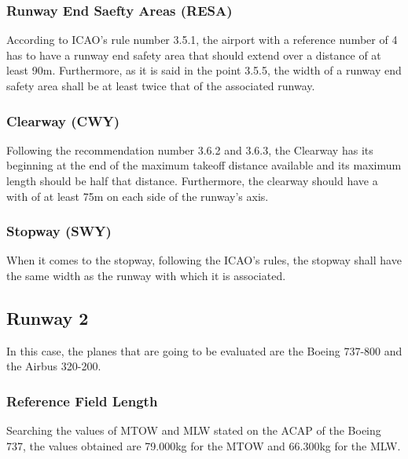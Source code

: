 			\subsubsection{Runway End Saefty Areas (RESA)}
			According to ICAO's rule number 3.5.1, the airport with a reference number of 4 has to have a runway end safety area that should extend over a distance of at least 90m. Furthermore, as it is said in the point 3.5.5, the width of a runway end safety area shall be at least twice that of the associated runway. 
			
			\subsubsection{Clearway (CWY)}
			Following the recommendation number 3.6.2 and 3.6.3, the Clearway has its beginning at the end of the maximum takeoff distance available and its maximum length should be half that distance. Furthermore, the clearway should have a with of at least 75m on each side of the runway's axis. 
			
			
			\subsubsection{Stopway (SWY)}
			When it comes to the stopway, following the ICAO's rules, the stopway shall have the same width as the runway with which it is associated.

			
		\subsection{Runway 2}
		In this case, the planes that are going to be evaluated are the Boeing 737-800 and the Airbus 320-200.
		\subsubsection{Reference Field Length}
		Searching the values of MTOW and MLW stated on the ACAP of the Boeing 737, the values obtained are 79.000kg for the MTOW and 66.300kg for the MLW.
		
